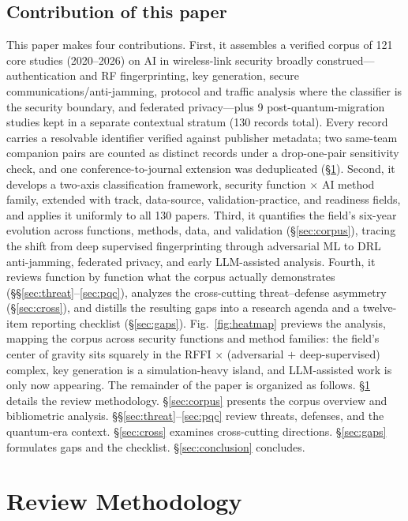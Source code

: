 \subsection{Contribution of this paper}
This paper makes four contributions. First, it assembles a verified corpus of 121 core studies (2020--2026) on AI in wireless-link security broadly construed---authentication and RF fingerprinting, key generation, secure communications/anti-jamming, protocol and traffic analysis where the classifier is the security boundary, and federated privacy---plus 9 post-quantum-migration studies kept in a separate contextual stratum (130 records total). Every record carries a resolvable identifier verified against publisher metadata; two same-team companion pairs are counted as distinct records under a drop-one-pair sensitivity check, and one conference-to-journal extension was deduplicated (\S\ref{sec:methods}). Second, it develops a two-axis classification framework, security function $\times$ AI method family, extended with track, data-source, validation-practice, and readiness fields, and applies it uniformly to all 130 papers. Third, it quantifies the field's six-year evolution across functions, methods, data, and validation (\S\ref{sec:corpus}), tracing the shift from deep supervised fingerprinting through adversarial ML to DRL anti-jamming, federated privacy, and early LLM-assisted analysis. Fourth, it reviews function by function what the corpus actually demonstrates (\S\S\ref{sec:threat}--\ref{sec:pqc}), analyzes the cross-cutting threat--defense asymmetry (\S\ref{sec:cross}), and distills the resulting gaps into a research agenda and a twelve-item reporting checklist (\S\ref{sec:gaps}).
Fig.~\ref{fig:heatmap} previews the analysis, mapping the corpus across security functions and method families: the field's center of gravity sits squarely in the RFFI $\times$ (adversarial $+$ deep-supervised) complex, key generation is a simulation-heavy island, and LLM-assisted work is only now appearing. The remainder of the paper is organized as follows. \S\ref{sec:methods} details the review methodology. \S\ref{sec:corpus} presents the corpus overview and bibliometric analysis. \S\S\ref{sec:threat}--\ref{sec:pqc} review threats, defenses, and the quantum-era context. \S\ref{sec:cross} examines cross-cutting directions. \S\ref{sec:gaps} formulates gaps and the checklist. \S\ref{sec:conclusion} concludes.

\section{Review Methodology}
\label{sec:methods}
